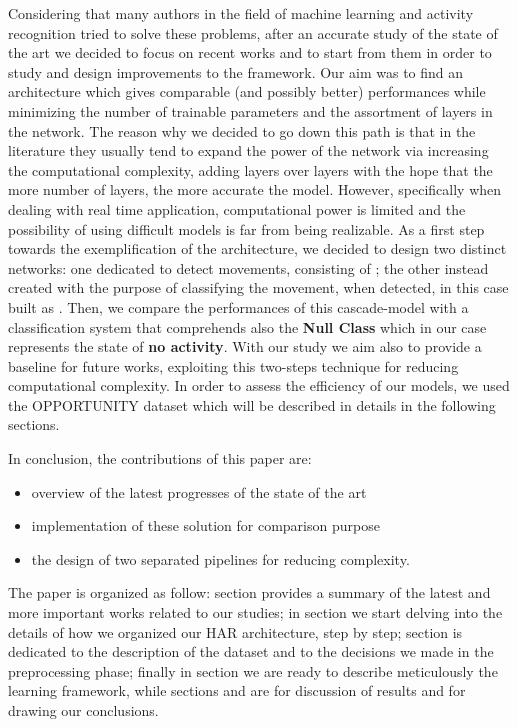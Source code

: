 Considering that many authors in the field of machine learning and activity recognition tried to solve these problems, after an accurate study of the state of the art we decided to focus on recent works and to start from them in order to study and design improvements to the framework. Our aim was to find an architecture which gives comparable (and possibly better) performances while minimizing the number of trainable parameters and the assortment of layers in the network. The reason why we decided to go down this path is that in the literature they usually tend to expand the power of the network via increasing the computational complexity, adding layers over layers with the hope that the more number of layers, the more accurate the model. However, specifically when dealing with real time application, computational power is limited and the possibility of using difficult models is far from being realizable. 
As a first step towards the exemplification of the architecture, we decided to design two distinct networks: one dedicated to detect movements, consisting of ; the other instead created with the purpose of classifying the movement, when detected, in this case built as . Then, we compare the performances of this cascade-model with a classification system that comprehends also the \textbf{Null Class} which in our case represents the state of \textbf{no activity}. With our study we aim also to provide a baseline for future works, exploiting this two-steps technique for reducing computational complexity. In order to assess the efficiency of our models, we used the OPPORTUNITY dataset \cite{Chavarriaga2013, ComplexAct-2010} which will be described in details in the following sections.

In conclusion, the contributions of this paper are:
\begin{itemize}
	\item overview of the latest progresses of the state of the art 
	\item implementation of these solution for comparison purpose
	\item the design of two separated pipelines for reducing complexity. 
\end{itemize}
 
The paper is organized as follow: section  provides a summary of the latest and more important works related to our studies; in section  we start delving into the details of how we organized our HAR architecture, step by step; section  is dedicated to the description of the dataset and to the decisions we made in the preprocessing phase; finally in section  we are ready to describe meticulously the learning framework, while sections  and  are for discussion of results and for drawing our conclusions. 